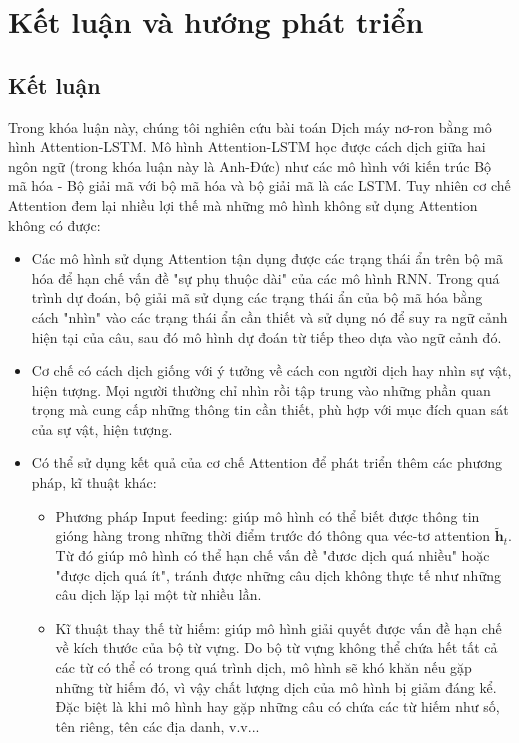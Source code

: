\chapter{Kết luận và hướng phát triển}
\ifpdf
    \graphicspath{{Chapter5/Chapter5Figs/PNG/}{Chapter5/Chapter5Figs/PDF/}{Chapter5/Chapter5Figs/}}
\else
    \graphicspath{{Chapter5/Chapter5Figs/EPS/}{Chapter5/Chapter5Figs/}}
\fi
\label{chap_5}

\section{Kết luận}

Trong khóa luận này, chúng tôi nghiên cứu bài toán Dịch máy nơ-ron bằng mô hình Attention-LSTM. Mô hình Attention-LSTM học được cách dịch giữa hai ngôn ngữ (trong khóa luận này là Anh-Đức) như các mô hình với kiến trúc Bộ mã hóa - Bộ giải mã với bộ mã hóa và bộ giải mã là các LSTM. Tuy nhiên cơ chế Attention đem lại nhiều lợi thế mà những mô hình không sử dụng Attention không có được:
\begin{itemize}
	\item Các mô hình sử dụng Attention tận dụng được các trạng thái ẩn trên bộ mã hóa để hạn chế vấn đề "sự phụ thuộc dài" của các mô hình RNN. Trong quá trình dự đoán, bộ giải mã sử dụng các trạng thái ẩn của bộ mã hóa bằng cách "nhìn" vào các trạng thái ẩn cần thiết và sử dụng nó để suy ra ngữ cảnh hiện tại của câu, sau đó mô hình dự đoán từ tiếp theo dựa vào ngữ cảnh đó.
	\item Cơ chế có cách dịch giống với ý tưởng về cách con người dịch hay nhìn sự vật, hiện tượng. Mọi người thường chỉ nhìn rồi tập trung vào những phần quan trọng mà cung cấp những thông tin cần thiết, phù hợp với mục đích quan sát của sự vật, hiện tượng.
	\item Có thể sử dụng kết quả của cơ chế Attention để phát triển thêm các phương pháp, kĩ thuật khác:
	\begin{itemize}
		\item Phương pháp Input feeding: giúp mô hình có thể biết được thông tin gióng hàng trong những thời điểm trước đó thông qua véc-tơ attention $\bm{\tilde{h}}_t$. Từ đó giúp mô hình có thể hạn chế vấn đề "đươc dịch quá nhiều" hoặc "được dịch quá ít", tránh được những câu dịch không thực tế như những câu dịch lặp lại một từ nhiều lần.
		\item Kĩ thuật thay thế từ hiếm: giúp mô hình giải quyết được vấn đề hạn chế về kích thước của bộ từ vựng. Do bộ từ vựng không thể chứa hết tất cả các từ có thể có trong quá trình dịch, mô hình sẽ khó khăn nếu gặp những từ hiếm đó, vì vậy chất lượng dịch của mô hình bị giảm đáng kể. Đặc biệt là khi mô hình hay gặp những câu có chứa các từ hiếm như số, tên riêng, tên các địa danh, v.v... 
	\end{itemize}
\end{itemize}

